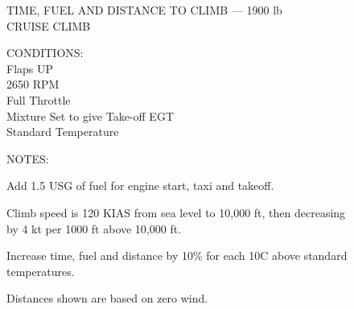 \begin{figure}[t]
\begin{center}
\begin{perfhdr}TIME, FUEL AND DISTANCE TO CLIMB --- 1900 lb\\
CRUISE CLIMB\\
\end{perfhdr}
\Large

\normalsize
\vspace{5ex}
    \raggedright 
    CONDITIONS:\\
    Flaps UP\\
    2650 RPM\\
    Full Throttle\\
    Mixture Set to give Take-off EGT\\
    Standard Temperature\\
\hfill

\vspace{\perfnoteskip}
    \raggedright NOTES:
    \begin{enumerate*}
      \item Add 1.5 USG of fuel for engine start, taxi and takeoff.
      \item Climb speed is 120 KIAS from sea level to 10,000 ft, then decreasing by 4 kt per 1000 ft above 10,000 ft.
      \item Increase time, fuel and distance by 10\% for each 10\textdegree C above standard temperatures.
      \item Distances shown are based on zero wind.
      \end{enumerate*}
\vspace{\perfnoteskip}
\settowidth{\colOne}{WEIGHT}
\settowidth{\colTwo}{PRESSURE}
\settowidth{\colThree}{TEMP}
\settowidth{\colFour}{CLIMB}
\settowidth{\colFive}{RATE OF}
\settowidth{\colSix}{TIME}
\settowidth{\colSeven}{USED}
\settowidth{\colEight}{DIST.}


\end{center}
\end{figure}
